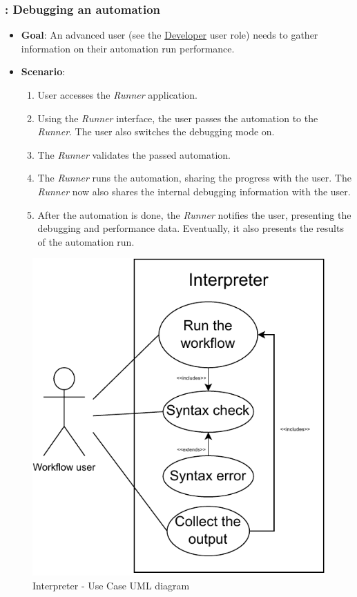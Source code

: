\subsubsection*{\usecase: Debugging an automation}
\begin{itemize}
    \item \textbf{Goal}: An advanced user (see the \hyperref[DevUserRole]{Developer} user role) needs to gather information on their automation run performance.
    \item \textbf{Scenario}: 
    \begin{enumerate}[label=\arabic*.]
        \item User accesses the \textit{Runner} application. 
        \item Using the \textit{Runner} interface, the user passes the automation to the \textit{Runner}. The user also
        switches the debugging mode on.
        \item The \textit{Runner} validates the passed automation.
        \item The \textit{Runner} runs the automation, sharing the progress with the user.
        The \textit{Runner} now also shares the internal debugging information with the user. 
        \item After the automation is done, the \textit{Runner} notifies the user, presenting the debugging 
        and performance data. Eventually, it also presents the results of the automation run.
    \end{enumerate}
\end{itemize}

\begin{center}
\begin{figure}[h!]
    \begin{center}
        \includegraphics{./img/interpreterUC.pdf}
    \end{center}
    \caption{Interpreter - Use Case UML diagram}
\end{figure}
\end{center}